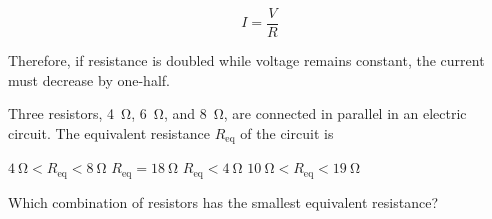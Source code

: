 \documentclass[]{exam}
\begin{document}
\begin{questions}
\begin{solution}
\begin{equation*}
    I = \frac{V}{R}
\end{equation*}

Therefore, if resistance is doubled while voltage remains constant, the current must decrease by one-half.
\end{solution}

\question
Three resistors, \SI{4}{\ohm}, \SI{6}{\ohm}, and \SI{8}{\ohm}, are connected in parallel in an electric circuit. The equivalent resistance $R_\mathrm{eq}$ of the circuit is
\bigskip

\begin{randomizeoneparchoices}
    \choice $\SI{4}{\ohm} < R_\mathrm{eq} < \SI{8}{\ohm}$
    \choice $R_\mathrm{eq} = \SI{18}{\ohm}$
    \correctchoice $R_\mathrm{eq} < \SI{4}{\ohm}$
    \choice $\SI{10}{\ohm} < R_\mathrm{eq} < \SI{19}{\ohm}$
\end{randomizeoneparchoices}


\question
Which combination of resistors has the smallest equivalent resistance?


\end{questions}
\end{document}
